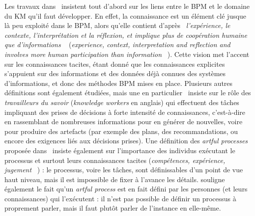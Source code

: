 Les travaux dans~\cite{di2015knowledge} insistent tout d'abord sur les liens entre le BPM et le domaine du KM qu'il faut développer.
En effet, la connaissance est un élément clé jusque là peu exploité dans le BPM, alors qu'elle contient d'après~\cite{davenport2005thinking} \og \textit{l'expérience, le contexte, l'interprétation et la réflexion, et implique plus de coopération humaine que d'informations} \fg~\cite{di2015knowledge} (\og \textit{experience, context, interpretation and reflection and involves more human participation than information} \fg~\cite{di2015knowledge}).
Cette vision met l'accent sur les connaissances tacites, étant donné que les connaissances explicites s'appuient sur des informations et des données déjà connues des systèmes d'informations, et donc des méthodes BPM mises en place.
Plusieurs autres définitions sont également étudiées, mais une en particulier~\cite{vaculin2011declarative} insiste sur le rôle des \textit{travailleurs du savoir} (\textit{knowledge workers} en anglais) qui effectuent des tâches impliquant des prises de décisions à forte intensité de connaissances, c'est-à-dire en rassemblant de nombreuses informations pour en générer de nouvelles, voire pour produire des artefacts (par exemple des plans, des recommandations, ou encore des exigences liés aux décisions prises).
Une définition des \textit{artful processes} proposée dans~\cite{hill2006beyond} insiste également sur l'importance des individus exécutant le processus et surtout leurs connaissances tacites (\og \textit{compétences, expérience, jugement} \fg~\cite{hill2006beyond}) : le processus, voire les tâches, sont définissables d'un point de vue haut niveau, mais il est impossible de fixer à l'avance les détails.
\cite{di2015knowledge} souligne également le fait qu'un \textit{artful process} est en fait défini par les personnes (et leurs connaissances) qui l'exécutent : il n'est pas possible de définir un processus à proprement parler, mais il faut plutôt parler de l'instance en elle-même.

\bigskip

